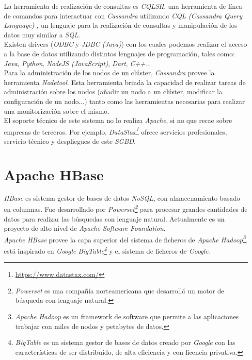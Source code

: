 \documentclass[11pt,a4paper]{article}
\begin{document}
La herramienta de realización de consultas es \emph{CQLSH}, una herramienta de línea de comandos para interactuar con \emph{Cassandra} utilizando \emph{CQL (Cassandra Query Language)} \cite{AP:3}, un lenguaje para la realización de consultas y manipulación de los datos muy similar a \emph{SQL}. \cite{WIKI:5} \\
Existen drivers (\emph{ODBC} y \emph{JDBC (Java)}) con los cuales podemos realizar el acceso a la base de datos utilizando distintos lenguajes de programación, tales como: \emph{Java}, \emph{Python}, \emph{NodeJS (JavaScript)}, \emph{Dart}, \emph{C++}... \cite{AP:4} \\
Para la administración de los nodos de un clúster, \emph{Cassandra} provee la herramienta \emph{Nodetool}. Esta herramienta brinda la capacidad de realizar tareas de administración sobre los nodos (añadir un nodo a un clúster, modificar la configuración de un nodo...) tanto como las herramientas necesarias para realizar una monitorización sobre el mismo. \cite{WIKI:5} \\

El soporte técnico de este sistema no lo realiza \emph{Apache}, si no que recae sobre empresas de terceros. Por ejemplo, \emph{DataStax\footnote{\url{https://www.datastax.com/}}} ofrece servicios profesionales, servicio técnico y despliegues de este \emph{SGBD}. \cite{APW:1}\\

\section{Apache HBase}

\emph{HBase} es sistema gestor de bases de datos \emph{NoSQL}, con almacenamiento basado en columnas. Fue desarrollado por \emph{Powerset\footnote{\emph{Powerset} es una compañía norteamericana que desarrolló un motor de búsqueda con lenguaje natural.\cite{WIKI:7}}} para procesar grandes cantidades de datos para realizar las búsquedas con lenguaje natural. Actualmente es un proyecto de alto nivel de \emph{Apache Software Foundation}. \cite{WIKI:8}\\
\emph{Apache HBase} provee la capa superior del sistema de ficheros de \emph{Apache Hadoop\footnote{\emph{Apache Hadoop} es un framework de software que permite a las aplicaciones trabajar con miles de nodos y petabytes de datos.\cite{WIKI:9}}}, está inspirado en \emph{Google BigTable\footnote{\emph{BigTable} es un sistema gestor de bases de datos creado por \emph{Google} con las características de ser distribuido, de alta eficiencia y con licencia privativa.\cite{WIKI:10}}} y el sistema de ficheros de \emph{Google}.\\
\end{document}

